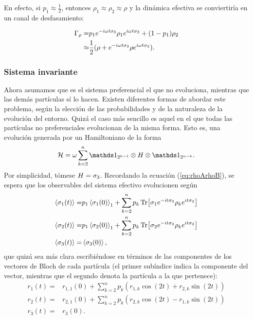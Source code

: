 En efecto, si $p_{1}\approx\frac{1}{2}$, entonces $\rho_{1}\approx\rho_{2}\approx\rho$ y la dinámica efectiva se conviertiría en un canal de desfasamiento:

\begin{align*}
    \Gamma_{\rho}=&p_{1}e^{-i\omega t \sigma_{3}}\rho_{1}e^{i\omega t \sigma_{3}}+(1-p_{1})\rho_{2}\\
    \approx&\frac{1}{2}(\rho+e^{-i\omega t \sigma_{3}}\rho e^{i\omega t \sigma_{3}}).
\end{align*}

\subsubsection{Sistema invariante}

Ahora asumamos que es el sistema preferencial el que no evoluciona, mientras que las demás partículas sí lo hacen. Existen diferentes formas de abordar este problema, según la elección de las probabilidades y de la naturaleza de la evolución del entorno. Quizá el caso más sencillo es aquel en el que todas las partículas no preferenciales evolucionan de la misma forma. Esto es, una evolución generada por un Hamiltoniano de la forma
\begin{equation*}
    \mcH=\omega\sum_{k=2}^{n}\Id_{2^{k-1}}\otimes H \otimes \Id_{2^{n-k}}.
\end{equation*}
Por simplicidad, tómese $H=\sigma_{3}$. Recordando la ecuación (\ref{eq:rhoArhoB}), se espera que los observables del sistema efectivo evolucionen según
\begin{align*}
    \expval{\sigma_{1}(t)}=&p_{1} \expval{\sigma_{1}(0)}_{1}+\sum_{k=2}^{n}p_{k}\Tr[\sigma_{1}e^{-it\sigma_{3}} \rho_{k} e^{it\sigma_{3}}]\\
    \expval{\sigma_{2}(t)}=&p_{1} \expval{\sigma_{2}(0)}_{1}+\sum_{k=2}^{n}p_{k}\Tr[\sigma_{2}e^{-it\sigma_{3}} \rho_{k} e^{it\sigma_{3}}]\\
    \expval{\sigma_{3}(t)}=&\expval{\sigma_{3}(0)},
\end{align*}
que quizá sea más clara escribiéndose en términos de las componentes de los vectores de Bloch de cada partícula (el primer subíndice indica la componente del vector, mientras que el segundo denota la partícula a la que pertenece):
\begin{align*}
    r_{1}(t)=&r_{1,1}(0)+\sum_{k=2}^{n}p_{k}(r_{1,k}\cos(2t)+r_{2,k}\sin(2t))\\
    r_{2}(t)=&r_{2,1}(0)+\sum_{k=2}^{n}p_{k}(r_{2,k}\cos(2t)-r_{1,k}\sin(2t))\\
    r_{3}(t)=&r_{3}(0).
\end{align*}
